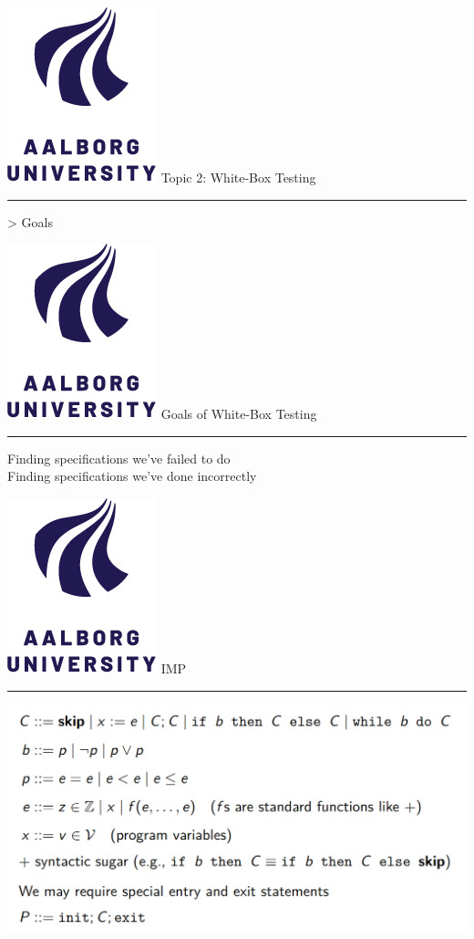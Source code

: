 \documentclass[aspectratio=1610,17pt,utf8]{beamer}
\newcommand{\mainframe}[1]{\color{blue} \includegraphics[width=.05\textwidth]{figures/aau.png} #1\\\hrule}
\newcommand{\mf}[1]{\mainframe{#1}}
\newcommand{\regularframe}[1]{\color{black}\includegraphics[width=.05\textwidth]{figures/aau.png} #1\\\hrule}
\newcommand{\rf}[1]{\regularframe{#1}}
\begin{document}

\begin{frame}{\mf{Topic 2: White-Box Testing}}
    > Goals\\
\end{frame}

\begin{frame}{\rf{Goals of White-Box Testing}}
    Finding specifications we've failed to do\\
    Finding specifications we've done incorrectly
\end{frame}

\begin{frame}{\rf{IMP}}
    \includegraphics[width=\textwidth]{figures/IMP.png}
\end{frame}
\end{document}
